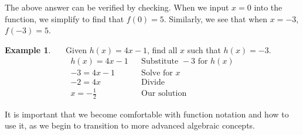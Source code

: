 \documentclass[12pt]{book}
\theoremstyle{definition}
\newtheorem{example}{Example}
\begin{document}
The above answer can be verified by checking.  When we input $x=0$ into the function, we simplify to find that $f(0)=5$.  Similarly, we see that when $x=-3$, $f(-3)=5$.
\begin{example}~~~Given $h(x)=4x-1$, find all $x$ such that $h(x)=-3$.
  \begin{eqnarray*}
    h (x) = 4x-1 & & \text{Substitute~}-3 \text{~for~} h(x)\\
   -3 = 4x-1  &  & \text{Solve~for~}x\\
   -2 = 4x  &  & \text{Divide}\\
	x=-\frac{1}{2}  &  & \text{Our solution}
	\end{eqnarray*}
 \end{example}
It is important that we become comfortable with function notation and how to use it, as we begin to transition to more advanced algebraic concepts.
\end{document}
